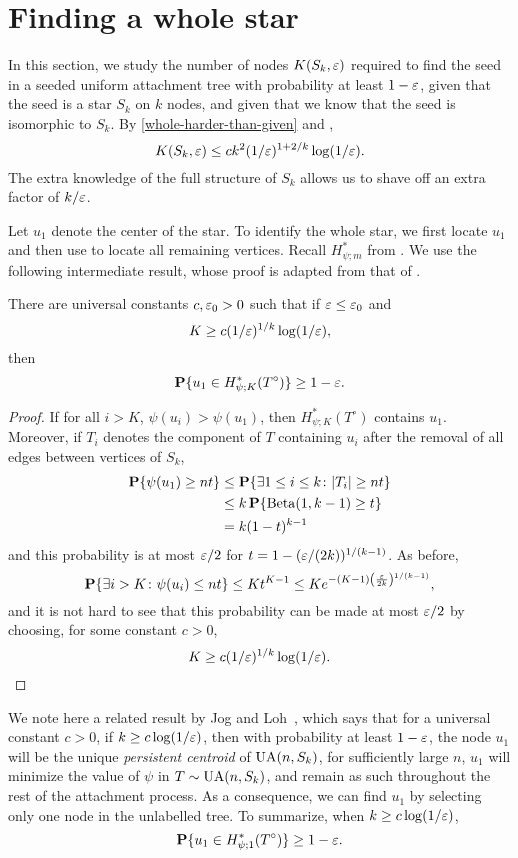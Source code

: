\section{Finding a whole star}

In this section, we study the number of nodes $K(S_k, \varepsilon)$ required
to find the seed in a seeded uniform attachment tree with probability
at least $1 - \varepsilon$, given that the seed is a star $S_k$ on $k$ nodes,
and given that we know that the seed is isomorphic to $S_k$. By
\eqref{whole-harder-than-given} and ,
\[
  K(S_k, \varepsilon) \le c k^2 (1/\varepsilon)^{1 + 2/k} \log(1/\varepsilon) .
\]
The extra knowledge of the full structure of $S_k$ allows us to shave
off an extra factor of $k/\varepsilon$.

Let $u_1$ denote the center of the star. To identify the whole star,
we first locate $u_1$ and then use  to
locate all remaining vertices. Recall $H^*_{\psi; m}$ from
. We use the following intermediate result, whose
proof is adapted from that of .
\begin{lem}
  There are universal constants $c, \varepsilon_0 > 0$ such that if
  $\varepsilon \le \varepsilon_0$ and
  \[
    K \ge c (1/\varepsilon)^{1/k} \log (1/\varepsilon) ,
  \]
  then
  \[
    \operatorname{\mathbf{P}}\{u_1 \in H^*_{\psi; K}(T^\circ)\} \ge 1 - \varepsilon .
  \]
\end{lem}
\begin{proof}
  If for all $i > K$, $\psi(u_i) > \psi(u_1)$, then
  $H^*_{\psi; K}(T^\circ)$ contains $u_1$. Moreover, if $T_i$ denotes
  the component of $T$ containing $u_i$ after the removal of all edges
  between vertices of $S_k$,
  \begin{align*}
    \operatorname{\mathbf{P}}\{\psi(u_1) \ge nt\} &\le \operatorname{\mathbf{P}}\{\exists 1 \le i \le k \colon |T_i| \ge nt\} \\
                            &\le k \operatorname{\mathbf{P}}\{ \operatorname{Beta}(1, k - 1) \ge t\} \\
                            &= k (1 - t)^{k - 1}
  \end{align*}
  and this probability is at most $\varepsilon/2$ for
  $t = 1 - (\varepsilon/(2k))^{1/(k - 1)}$. As before,
  \[
    \Pr\{\exists i > K \colon \psi(u_i) \le nt\} \le K t^{K - 1} \le K e^{-(K - 1) \left(\frac{\eps}{2k}\right)^{1/(k - 1)}},
  \]
  and it is not hard to see that this probability can be made at most
  $\varepsilon/2$ by choosing, for some constant $c > 0$,
  \[
    K \ge c (1/\varepsilon)^{1/k} \log (1/\varepsilon) . \qedhere
  \]
\end{proof}
We note here a related result by Jog and
Loh~\cite[Theorem~4]{jog-persistence}, which says that for a
universal constant $c > 0$, if $k \ge c \log (1/\varepsilon)$, then with
probability at least $1 - \varepsilon$, the node $u_1$ will be the unique
\emph{persistent centroid} of $\operatorname{UA}(n, S_k)$, \ie for sufficiently
large $n$, $u_1$ will minimize the value of $\psi$ in
$T \sim \operatorname{UA}(n, S_k)$, and remain as such throughout the rest of the
attachment process. As a consequence, we can find $u_1$ by selecting
only one node in the unlabelled tree. To summarize, when
$k \ge c \log (1/\varepsilon)$,
\[
  \operatorname{\mathbf{P}}\{u_1 \in H^*_{\psi; 1}(T^\circ)\} \ge 1 - \varepsilon .
\]

